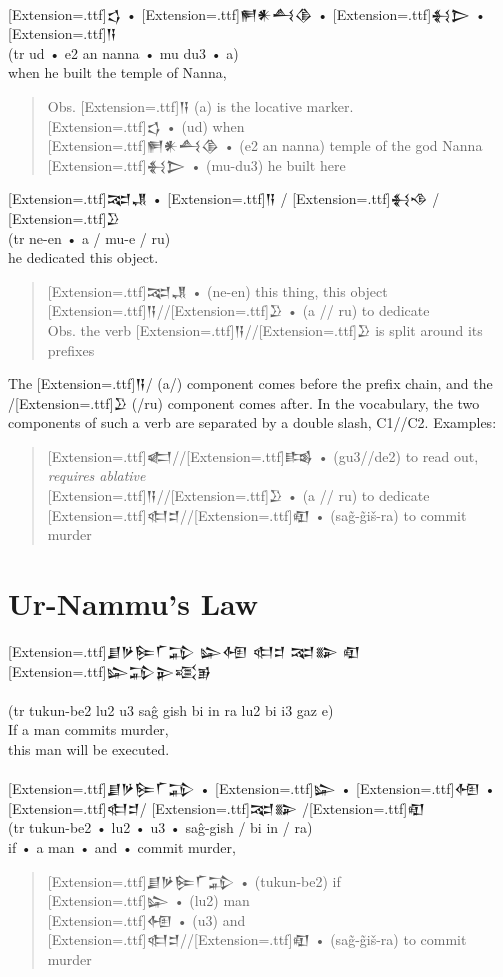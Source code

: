 \documentclass[a4paper,12pt]{book}
\newcommand{\fcn}{\setmainfont{Akkadian}[Extension=.ttf]}
\newcommand{\fcm}{\large\setmainfont{Akkadian}[Extension=.ttf]}
\newcommand{\fsm}{\Large\setmainfont{Akkadian}[Extension=.ttf]}
\begin{document}
\verb||\\
{\fcm 𒌓} • {\fcm 𒂍𒀭𒋀𒆠} • {\fcm 𒈬𒆕} • {\fcm 𒀀}\\
(tr ud • e2 an nanna • mu du3 • a)\\
when he built the temple of Nanna,\\
\begin{quote}
Obs. {\fcn 𒀀} (a) is the locative marker.\\
{\fcm 𒌓} • (ud) when\\
{\fcm 𒂍𒀭𒋀𒆠} • (e2 an nanna) temple of the god Nanna\\
{\fcm 𒈬𒆕} • (mu-du3) he built here
\end{quote}

\newpage
\noindent
{\fcm 𒉈𒂗} • {\fcm 𒀀} / {\fcm 𒈬𒈾} / {\fcm 𒊒}\\
(tr ne-en • a / mu-e / ru)\\ 
he dedicated this object.\\
\begin{quote}
{\fcm 𒉈𒂗} • (ne-en) this thing, this object\\
{\fcm 𒀀}//{\fcm 𒊒} • (a // ru) to dedicate\\
Obs. the verb {\fcn 𒀀}//{\fcn 𒊒} is split around its prefixes
\end{quote}
The {\fcn 𒀀}/ (a/) component comes before the prefix chain,
and the /{\fcn 𒊒} (/ru) component comes after.
In the vocabulary, the two components
of such a verb are separated by a double
slash, C1//C2. Examples:
\begin{quote}
{\fcm 𒅗}//{\fcm 𒌤} • (gu3//de2) to read out,
  {\em requires ablative}\\
{\fcm 𒀀}//{\fcm 𒊒} • (a // ru) to dedicate\\
{\fcm 𒊕𒄑}//{\fcm 𒊏} • (sag̃-g̃iš-ra) to commit murder
\end{quote}

\section*{Ur-Nammu's Law}
\noindent
{\fsm 𒋗𒃻𒌉𒇲𒁉 𒇽𒅇 𒊕𒄑 𒉈𒅔 𒊏}\\
{\fsm 𒇽𒁉𒉌𒄤𒂊}\\
\verb||\\
(tr tukun-be2 lu2 u3 saĝ gish bi in ra lu2 bi i3 gaz e)\\
If a man commits murder,\\
this man will be executed.\\

\verb||\\
{\fcm 𒋗𒃻𒌉𒇲𒁉} • {\fcm 𒇽} • {\fcm 𒅇}
     • {\fcm 𒊕𒄑}/ {\fcm 𒉈𒅔} /{\fcm 𒊏}\\
(tr tukun-be2 • lu2 • u3 • saĝ-gish / bi in / ra)\\
if • a man • and • commit murder,\\
\begin{quote}  
{\fcm 𒋗𒃻𒌉𒇲𒁉} • (tukun-be2) if\\
{\fcm 𒇽} • (lu2) man\\
{\fcm 𒅇} • (u3) and\\
{\fcm 𒊕𒄑}//{\fcm 𒊏} • (sag̃-g̃iš-ra) to commit murder
\end{quote}
\end{document}
